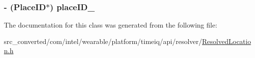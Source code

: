 \subsubsection[{place\+I\+D\+\_\+}]{\setlength{\rightskip}{0pt plus 5cm}-\/ (Place\+I\+D$\ast$) place\+I\+D\+\_\+}\label{interface_resolved_location_a102fcd28defcc06837f9ab6d2385b44f}


The documentation for this class was generated from the following file\+:\begin{DoxyCompactItemize}
\item 
src\+\_\+converted/com/intel/wearable/platform/timeiq/api/resolver/\hyperlink{_resolved_location_8h}{Resolved\+Location.\+h}\end{DoxyCompactItemize}
